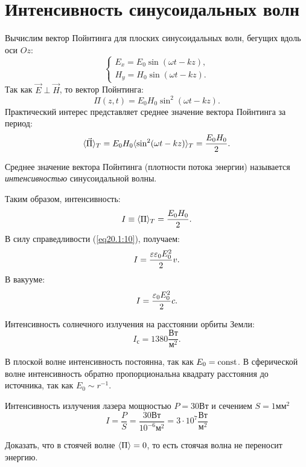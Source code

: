 \section{Интенсивность синусоидальных волн}

	Вычислим вектор Пойнтинга для плоских синусоидальных волн, бегущих вдоль оси
    \( Oz \):
	\[
        \left\{
        \begin{array}{l}
            E_x = E_0\sin(\omega t - kz), \\
            H_y = H_0\sin(\omega t - kz).
        \end{array}
        \right.
    \]
	Так как \( \vec{E} \perp \vec{H} \), то вектор Пойнтинга:
	\[
        \Pi(z, t) = E_0H_0\sin^2(\omega t - kz).
    \]
	Практический интерес представляет среднее значение вектора Пойнтинга за
    период:
	\[
        \langle\vec{\Pi}\rangle_T = E_0H_0\langle\sin^2(\omega t -kz)\rangle_T =
        \frac{E_0H_0}{2}.
    \]
	
	\begin{definition}
        Среднее значение вектора Пойнтинга (плотности потока энергии) называется
        \textit{интенсивностью} синусоидальной волны.
	\end{definition}
	Таким образом, интенсивность:
	\[
        I \equiv \langle\Pi\rangle_T = \frac{E_0H_0}{2}.
    \]
	В силу справедливости (\ref{eq20.1:10}), получаем:
	\[
        I = \frac{\varepsilon\varepsilon_0 E_0^2}{2}v.
    \]
	В вакууме:
    \[
        I = \frac{\varepsilon_0 E_0^2}{2}c.
    \]
    \begin{remark}
        Интенсивность солнечного излучения на расстоянии орбиты Земли:
        \[
            I_\textit{с} = 1380 \frac{\text{Вт}}{\text{м}^2}.
        \]
    \end{remark}

	В плоской волне интенсивность постоянна, так как \( E_0 = \mathrm{const} \). В 
    сферической волне интенсивность обратно пропорциональна квадрату расстояния
    до источника, так как \( E_0 \sim r^{-1} \).
	
	\begin{example}
        Интенсивность излучения лазера мощностью \( P = 30 \)Вт и сечением
        \( S = 1\text{мм}^2 \)
        \[
            I = \frac{P}{S} = \frac{30\text{Вт}}{10^{-6}\text{м}^2} =
            3\cdot10^7\frac{\text{Вт}}{\text{м}^2}
        \]
	\end{example}

    \begin{example}
        Доказать, что в стоячей волне \( \langle\Pi\rangle = 0 \), то есть стоячая
        волна не переносит энергию.
    \end{example}
	
